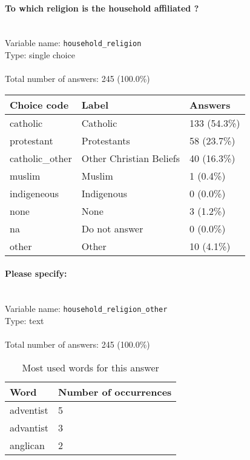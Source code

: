 \documentclass[11.5pt, a4paper]{scrartcl}
\begin{document}
\paragraph{To which religion is the household affiliated ?}
\  \\Variable name: \texttt{household\_religion}\\
Type: single choice\\
\\Total number of answers: 245 (100.0\%)
\\[0.2em] \begin{tabular}{p{4cm}|p{8cm}|p{3cm}}
Choice code & Label & Answers \\
\hline
catholic & Catholic& \cellcolor{color2}133 (54.3\%)\\
\cellcolor{mygray} protestant & \cellcolor{mygray}Protestants & \cellcolor{color1}58 (23.7\%)\\
catholic\_other & Other Christian Beliefs& \cellcolor{color0}40 (16.3\%)\\
\cellcolor{mygray} muslim & \cellcolor{mygray}Muslim & \cellcolor{color0}1 (0.4\%)\\
indigeneous & Indigenous & \cellcolor{color0}0 (0.0\%)\\
\cellcolor{mygray} none & \cellcolor{mygray}None & \cellcolor{color0}3 (1.2\%)\\
na & Do not answer& \cellcolor{color0}0 (0.0\%)\\
\cellcolor{mygray} other & \cellcolor{mygray}Other & \cellcolor{color0}10 (4.1\%)\\
\end{tabular}
\paragraph{Please specify:}
\  \\Variable name: \texttt{household\_religion\_other}\\
Type: text\\
\\Total number of answers: 245 (100.0\%)
\\[0.2em]\begin{table}[H]
 \begin{tabular}{p{4cm}|p{8cm}}
Word & Number of occurrences  \\
\hline
\cellcolor{mygray}adventist&\cellcolor{mygray}5\\
\hline
advantist&3\\
\hline
\cellcolor{mygray}anglican&\cellcolor{mygray}2\\
\hline
\end{tabular}
\caption{\label{tab:table-name} Most used words for this answer}
\end{table}
\end{document}
